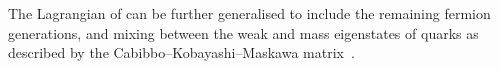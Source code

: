The Lagrangian of  can be further generalised to
include the remaining fermion generations, and mixing between the weak and mass
eigenstates of quarks as described by the Cabibbo--Kobayashi--Maskawa
matrix~\cite{Cabibbo:1963yz,Kobayashi:1973fv}.



